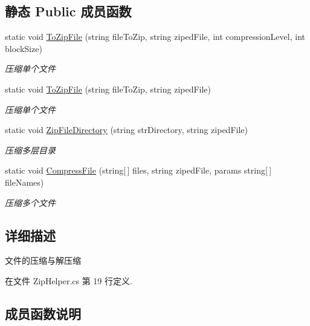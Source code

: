 \subsection*{静态 Public 成员函数}
\begin{DoxyCompactItemize}
\item 
static void \hyperlink{class_x_c_l_net_tools_1_1_file_handler_1_1_zip_helper_a4437b013f4b0db430cb1fd6097ed54a1}{To\+Zip\+File} (string file\+To\+Zip, string ziped\+File, int compression\+Level, int block\+Size)
\begin{DoxyCompactList}\small\item\em 压缩单个文件 \end{DoxyCompactList}\item 
static void \hyperlink{class_x_c_l_net_tools_1_1_file_handler_1_1_zip_helper_ab59c063455118d1eedb3a1af719db063}{To\+Zip\+File} (string file\+To\+Zip, string ziped\+File)
\begin{DoxyCompactList}\small\item\em 压缩单个文件 \end{DoxyCompactList}\item 
static void \hyperlink{class_x_c_l_net_tools_1_1_file_handler_1_1_zip_helper_a1231101acec5d274c2770115d1584ae3}{Zip\+File\+Directory} (string str\+Directory, string ziped\+File)
\begin{DoxyCompactList}\small\item\em 压缩多层目录 \end{DoxyCompactList}\item 
static void \hyperlink{class_x_c_l_net_tools_1_1_file_handler_1_1_zip_helper_abd0e8402a3d1ea9ca9f6c97cb46d5b89}{Compress\+File} (string\mbox{[}$\,$\mbox{]} files, string ziped\+File, params string\mbox{[}$\,$\mbox{]} file\+Names)
\begin{DoxyCompactList}\small\item\em 压缩多个文件 \end{DoxyCompactList}\end{DoxyCompactItemize}


\subsection{详细描述}
文件的压缩与解压缩 



在文件 Zip\+Helper.\+cs 第 19 行定义.



\subsection{成员函数说明}
